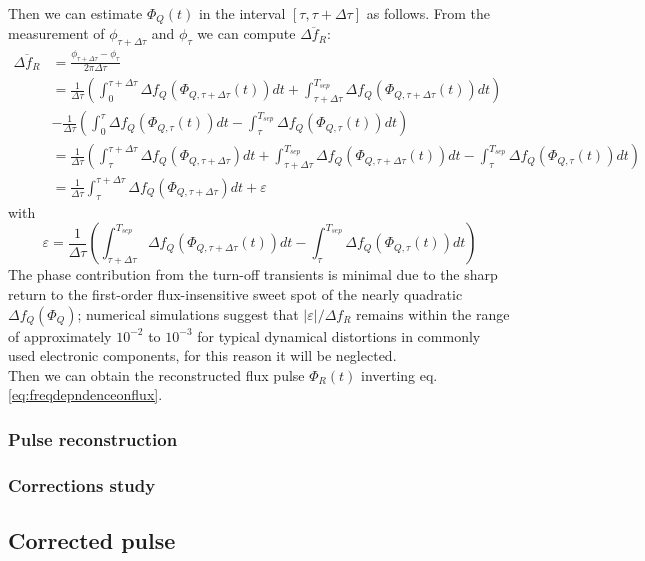 Then we can estimate $\Phi_Q(t)$ in the interval $[\tau,\tau+\Delta\tau]$ as follows. From the measurement of $\phi_{\tau + \Delta\tau}$ and $\phi_\tau$ we can compute $\overline{\Delta f_R}$:
\begin{align}\label{eq:detuning}
    \overline{\Delta f_R} &= \frac{\phi_{\tau+\Delta\tau} - \phi_\tau}{2\pi\Delta\tau}\\ 
    &= \frac{1}{\Delta\tau}\left(\int_{0}^{\tau+\Delta\tau}\Delta f_Q (\Phi_{Q,\tau+\Delta\tau}(t))dt + \int_{\tau+\Delta\tau}^{T_{sep}}\Delta f_Q (\Phi_{Q,\tau+\Delta\tau}(t))dt\right) \\
    &-\frac{1}{\Delta\tau}\left(\int_{0}^{\tau}\Delta f_Q (\Phi_{Q,\tau}(t))dt - \int_{\tau}^{T_{sep}}\Delta f_Q (\Phi_{Q,\tau}(t))dt\right)\\
    &=\frac{1}{\Delta\tau}\left(\int_{\tau}^{\tau+\Delta\tau} \Delta f_Q(\Phi_{Q,\tau+\Delta\tau})dt + \int_{\tau+\Delta\tau}^{T_{sep}}\Delta f_Q (\Phi_{Q,\tau+\Delta\tau}(t))dt - \int_{\tau}^{T_{sep}}\Delta f_Q (\Phi_{Q,\tau}(t))dt\right)\\
    &= \frac{1}{\Delta\tau}\int_{\tau}^{\tau+\Delta\tau} \Delta f_Q(\Phi_{Q,\tau+\Delta\tau})dt + \varepsilon
\end{align}  
with \[\varepsilon = \frac{1}{\Delta\tau}\left(\int_{\tau+\Delta\tau}^{T_{sep}}\Delta f_Q (\Phi_{Q,\tau+\Delta\tau}(t))dt - \int_{\tau}^{T_{sep}}\Delta f_Q (\Phi_{Q,\tau}(t))dt\right)\]
The phase contribution from the turn-off transients is minimal due to the sharp return to the first-order flux-insensitive sweet spot of the nearly quadratic $\Delta f_Q(\Phi_Q)$; 
numerical simulations suggest that $|\varepsilon|/\Delta f_R$ remains within the range of approximately $10^{-2}$ to $10^{-3}$ for typical dynamical distortions in commonly used electronic components\cite{negligible}\cite{Langford2017}, for this reason it will be neglected.\\

Then we can obtain the reconstructed flux pulse $\Phi_R(t)$ inverting eq. \ref{eq:freqdepndenceonflux}.
\subsubsection{Pulse reconstruction}

\subsubsection{Corrections study}

\subsection{Corrected pulse}

